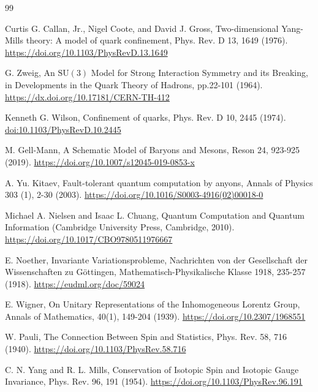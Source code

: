 \documentclass[12pt,a4paper]{article}
\begin{document}
\begin{thebibliography}{99}
	
	
	Curtis G. Callan, Jr., Nigel Coote, and David J. Gross,
	Two-dimensional Yang-Mills theory: A model of quark confinement,
	Phys. Rev. D 13, 1649 (1976).
	\url{https://doi.org/10.1103/PhysRevD.13.1649}
	
	
	G. Zweig,
	An $\mathrm{SU}(3)$ Model for Strong Interaction Symmetry and its Breaking,
	in Developments in the Quark Theory of Hadrons, pp.22-101 (1964).  
	\url{https://dx.doi.org/10.17181/CERN-TH-412}
	
	
	Kenneth G. Wilson,
	Confinement of quarks,
	Phys. Rev. D 10, 2445 (1974).
	\href{https://doi.org/10.1103/PhysRevD.10.2445}{doi:10.1103/PhysRevD.10.2445}  
	
	
	M. Gell-Mann,
	A Schematic Model of Baryons and Mesons,
	Reson 24, 923-925 (2019).
	\url{https://doi.org/10.1007/s12045-019-0853-x}
	
	
	A. Yu. Kitaev,
	Fault-tolerant quantum computation by anyons,
	Annals of Physics 303 (1), 2-30 (2003).
	\url{https://doi.org/10.1016/S0003-4916(02)00018-0}
	
	
	Michael A. Nielsen and Isaac L. Chuang, 
	Quantum Computation and Quantum Information
	(Cambridge University Press, Cambridge, 2010).
	\url{https://doi.org/10.1017/CBO9780511976667}
	
	
	E. Noether,	
	Invariante Variationsprobleme,
	Nachrichten von der Gesellschaft der Wissenschaften zu Göttingen, Mathematisch-Physikalische Klasse 1918, 235-257 (1918).
	\url{https://eudml.org/doc/59024}
	
	
	E. Wigner, 
	On Unitary Representations of the Inhomogeneous Lorentz Group, 
	Annals of Mathematics, 40(1), 149-204 (1939).
	\url{https://doi.org/10.2307/1968551}
	
	
	W. Pauli,
	The Connection Between Spin and Statistics,
	Phys. Rev. 58, 716 (1940).
	\url{https://doi.org/10.1103/PhysRev.58.716}
	
	
	C. N. Yang and R. L. Mills, 
	Conservation of Isotopic Spin and Isotopic Gauge Invariance, 
	Phys. Rev. 96, 191 (1954).
	\url{https://doi.org/10.1103/PhysRev.96.191} 
	

\end{thebibliography}
\end{document}
